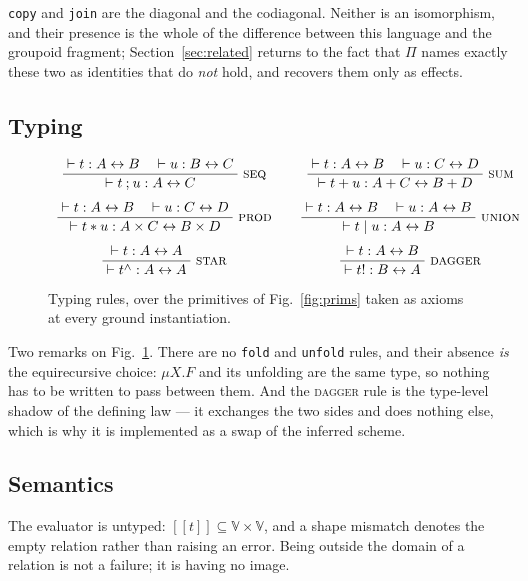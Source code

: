 \documentclass[runningheads,envcountsame]{llncs}
\newcommand{\den}[1]{\ensuremath{[\![#1]\!]}}
\newcommand{\iso}{\leftrightarrow}
\newcommand{\rul}[2]{\ensuremath{\dfrac{\;#1\;}{\;#2\;}}}
\newcommand{\clo}{\ensuremath{^{\wedge}}}
\begin{document}
\texttt{copy} and \texttt{join} are the diagonal and the codiagonal. Neither is an
isomorphism, and their presence is the whole of the difference between this
language and the groupoid fragment; Section~\ref{sec:related} returns to the fact
that $\Pi$ names exactly these two as identities that do \emph{not} hold, and
recovers them only as effects.

\subsection{Typing}

\begin{figure}[t]
\centering
\[
\begin{array}{c@{\qquad}c}
\rul{\vdash t : A \iso B \quad \vdash u : B \iso C}
    {\vdash t \mathbin{;} u : A \iso C} \;\textsc{seq}
&
\rul{\vdash t : A \iso B \quad \vdash u : C \iso D}
    {\vdash t + u : A + C \iso B + D} \;\textsc{sum}
\\[3.2ex]
\rul{\vdash t : A \iso B \quad \vdash u : C \iso D}
    {\vdash t * u : A \times C \iso B \times D} \;\textsc{prod}
&
\rul{\vdash t : A \iso B \quad \vdash u : A \iso B}
    {\vdash t \mid u : A \iso B} \;\textsc{union}
\\[3.2ex]
\rul{\vdash t : A \iso A}{\vdash t\clo : A \iso A} \;\textsc{star}
&
\rul{\vdash t : A \iso B}{\vdash t! : B \iso A} \;\textsc{dagger}
\end{array}
\]
\caption{Typing rules, over the primitives of Fig.~\ref{fig:prims} taken as axioms
at every ground instantiation.}
\label{fig:typing}
\end{figure}

Two remarks on Fig.~\ref{fig:typing}. There are no \texttt{fold} and
\texttt{unfold} rules, and their absence \emph{is} the equirecursive choice:
$\mu X.F$ and its unfolding are the same type, so nothing has to be written to pass
between them. And the \textsc{dagger} rule is the type-level shadow of the defining
law --- it exchanges the two sides and does nothing else, which is why it is
implemented as a swap of the inferred scheme.

\subsection{Semantics}

The evaluator is untyped: $\den{t} \subseteq \mathbb{V} \times \mathbb{V}$, and a
shape mismatch denotes the empty relation rather than raising an error. Being
outside the domain of a relation is not a failure; it is having no image.
\end{document}
